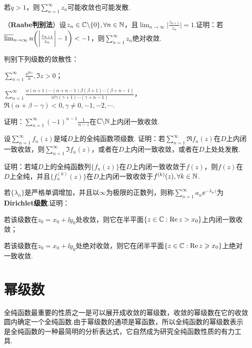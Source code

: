 \begin{xiti}
\begin{enuma}
      \item 若$q>1$，则$\sum_{n=1}^\infty z_n$可能收敛也可能发散.
    \end{enuma}
  \item （\textbf{Raabe判别法}）设$z_n\in\mathbb C\backslash\{0\},\forall n\in \mathbb N$，且$\lim_{n\to\infty}\bigg|\frac{z_{n+1}}{z_n}\bigg|=1$.证明：若$\varlimsup_{n\to\infty}n\bigg(\bigg|\frac{z_{n+1}}{z_n}\bigg|-1\bigg)<-1$，则$\sum_{n=1}^\infty z_n$绝对收敛.
  \item 判别下列级数的敛散性：
    \begin{enuma}
      \item $\sum_{n=1}^\infty\frac{\ee^{\ii nz}}n,\Im z>0$；
      \item $\sum_{n=1}^\infty\frac{\alpha(\alpha+1)\cdots
          (\alpha+n-1)\beta(\beta+1)\cdots(\beta+n-1)}{n!\gamma(\gamma+1)
          \cdots(\gamma+n-1)}$，$\Re(\alpha+\beta-\gamma)<0,\gamma\ne0,-1,-2,\cdots$.
    \end{enuma}
  \item 证明：$\sum_{n=1}^\infty(-1)^{n-1}\frac1{n-z}$在$\mathbb C\backslash\mathbb N$上内闭一致收敛.
  \item 设$\sum_{n=1}^\infty f_n(z)$是域$D$上的全纯函数项级数. 证明：若$\sum_{n=1}^\infty\Re f_n(z)$在$D$上内闭一致收敛，则$\sum_{n=1}^\infty \Im f_n(z)$，或者在$D$上内闭一致收敛，或者在$D$上处处发散.
  \item 证明：若域$D$上的全纯函数列$\{f_n(z)\}$在$D$上内闭一致收敛于$f(z)$，则$f(z)$在$D$上全纯，并且$\{f_n^{(k)}(z)\}$在$D$上内闭一致收敛于$f^{(k)}(z),\forall k\in\mathbb N$.
  \item 若$\{\lambda_n\}$是严格单调增加，并且以$\infty$为极限的正数列，则称$\sum_{n=1}^\infty a_n\ee^{-\lambda_n z}$为\textbf{Dirichlet级数}.证明：
    \begin{enuma}
      \item 若该级数在$z_0=x_0+\ii y_0$处收敛，则它在半平面$\{z\in\mathbb C:\operatorname{Re} z>x_0\}$上内闭一致收敛；
      \item 若该级数在$z_0=x_0+\ii y_0$处绝对收敛，则它在闭半平面$\{z\in\mathbb C:\operatorname{Re} z\geqslant x_0\}$上绝对一致收敛.
    \end{enuma}
\end{xiti}

\section{幂级数\label{sec4.2}}
全纯函数最重要的性质之一是可以展开成收敛的幂级数，收敛的幂级数在它的收敛圆内确定一个全纯函数.由于幂级数的通项是幂函数，所以全纯函数的幂级数表示是全纯函数的一种最简明的分析表达式，它自然成为研究全纯函数性质的有力工具.

